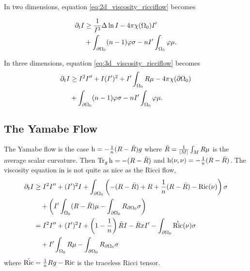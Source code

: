 \documentclass{amsart}
\begin{document}
In two dimensions, equation \eqref{eq:2d_viscosity_ricciflow} becomes

\begin{equation}
\label{eq:2d_viscosity_conformalcoupledricciflow}
\begin{split}
\partial_t I &\geq \frac{1}{I^3} \Delta \ln I - 4\pi\chi(\Omega_0)I' \\
&+ \int_{\partial {\Omega_0}} (n-1) \varphi\sigma - n I' \int_{\Omega_0} \varphi \mu.
\end{split}
\end{equation}

In three dimensions, equation \eqref{eq:3d_viscosity_ricciflow} becomes
\begin{equation}
\label{eq:3d_viscosity_conformalcoupledricciflow}
\begin{split}
\partial_t I &\geq I^2I'' + I(I')^2 + I'\int_{\Omega_0} R \mu - 4\pi\chi(\partial {\Omega_0}) \\
&+ \int_{\partial {\Omega_0}} (n-1) \varphi\sigma - n I' \int_{\Omega_0} \varphi \mu.
\end{split}
\end{equation}

\subsection{The Yamabe Flow}
\label{subsec:flows_yamabe}

The Yamabe flow is the case \(\operatorname{h} = -\tfrac{1}{n}(R - \bar{R})g\) where \(\bar{R} = \tfrac{1}{\left|{M}\right|} \int_M R \mu\) is the average scalar curvature. Then \(\operatorname{Tr}_g \operatorname{h} = -(R - \bar{R})\) and \(\operatorname{h}(\nu, \nu) = -\tfrac{1}{n}(R - \bar{R})\). The viscosity equation in  is not quite as nice as the Ricci flow,
\[
\begin{split}
\partial_t I &\geq I^2 I'' +  (I')^2 I + \int_{\partial {\Omega_0}} \left(-(R - \bar{R}) + R + \frac{1}{n}(R - \bar{R}) - \operatorname{Ric}(\nu)\right) \sigma \\
&\quad + \left(I'\int_{\Omega_0} (R - \bar{R}) \mu - \int_{\partial {\Omega_0}} R_{\partial {\Omega_0}}\sigma \right) \\
&= I^2 I'' +  (I')^2 I + \left(1 - \frac{1}{n}\right) \bar{R} I - \bar{R}xI' - \int_{\partial {\Omega_0}} \mathring{\operatorname{Ric}} (\nu) \sigma \\
&\quad + I' \int_{\Omega_0} R \mu - \int_{\partial {\Omega_0}} R_{\partial {\Omega_0}}\sigma
\end{split}
\]
where \(\mathring{\operatorname{Ric}} = \tfrac{1}{n}Rg - \operatorname{Ric}\) is the traceless Ricci tensor.
\end{document}
